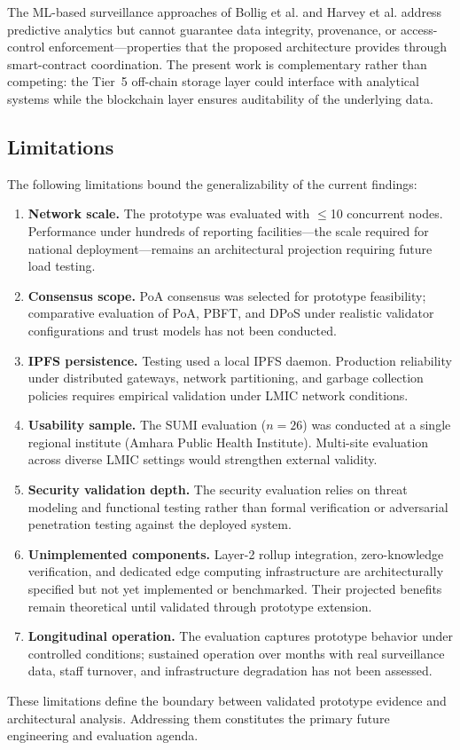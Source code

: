 The ML-based surveillance approaches of Bollig et al.\cite{bollig2020machine} and Harvey et al.\cite{harvey2021predicting} address predictive analytics but cannot guarantee data integrity, provenance, or access-control enforcement---properties that the proposed architecture provides through smart-contract coordination. The present work is complementary rather than competing: the Tier~5 off-chain storage layer could interface with analytical systems while the blockchain layer ensures auditability of the underlying data.

\subsection{Limitations}\label{subsec:limitations}

The following limitations bound the generalizability of the current findings:

\begin{enumerate}
\item \textbf{Network scale.} The prototype was evaluated with $\leq$10 concurrent nodes. Performance under hundreds of reporting facilities---the scale required for national deployment---remains an architectural projection requiring future load testing.

\item \textbf{Consensus scope.} PoA consensus was selected for prototype feasibility; comparative evaluation of PoA, PBFT, and DPoS under realistic validator configurations and trust models has not been conducted.

\item \textbf{IPFS persistence.} Testing used a local IPFS daemon. Production reliability under distributed gateways, network partitioning, and garbage collection policies requires empirical validation under LMIC network conditions.

\item \textbf{Usability sample.} The SUMI evaluation ($n=26$) was conducted at a single regional institute (Amhara Public Health Institute). Multi-site evaluation across diverse LMIC settings would strengthen external validity.

\item \textbf{Security validation depth.} The security evaluation relies on threat modeling and functional testing rather than formal verification or adversarial penetration testing against the deployed system.

\item \textbf{Unimplemented components.} Layer-2 rollup integration, zero-knowledge verification, and dedicated edge computing infrastructure are architecturally specified but not yet implemented or benchmarked. Their projected benefits remain theoretical until validated through prototype extension.

\item \textbf{Longitudinal operation.} The evaluation captures prototype behavior under controlled conditions; sustained operation over months with real surveillance data, staff turnover, and infrastructure degradation has not been assessed.
\end{enumerate}

These limitations define the boundary between validated prototype evidence and architectural analysis. Addressing them constitutes the primary future engineering and evaluation agenda.

